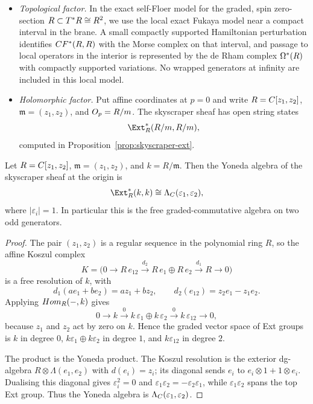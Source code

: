 \documentclass[11pt]{memoir}
\begin{document}
  \begin{itemize}
    \item \textit{Topological factor.} In the exact self-Floer model for
      the graded, spin zero-section $R\subset T^*R\cong R^2$, we use the
      local exact Fukaya model near a compact interval in the brane. A small
      compactly supported Hamiltonian perturbation identifies $CF^*(R,R)$
      with the Morse complex on that interval, and passage to local operators
      in the interior is represented by the de Rham complex $\Omega^*(R)$
      with compactly supported variations. No wrapped generators at infinity
      are included in this local model.
    \item \textit{Holomorphic factor.} Put affine coordinates at $p=0$ and write
      $R=C[z_1,z_2]$, $\mathfrak m=(z_1,z_2)$, and $O_p=R/m$.
      The skyscraper sheaf has open string states
      $$\Ext^*_R(R/\mathfrak m,R/\mathfrak m),$$
      computed in Proposition~\ref{prop:skyscraper-ext}.
  \end{itemize}

\begin{prop}\label{prop:skyscraper-ext}
  Let $R=C[z_1,z_2]$, $\mathfrak m=(z_1,z_2)$, and $k=R/\mathfrak m$. Then
  the Yoneda algebra of the skyscraper sheaf at the origin is
  $$\Ext^*_R(k,k)\cong\Lambda_{\C}(\varepsilon_1,\varepsilon_2),$$
  where $|\varepsilon_i|=1$. In particular this is the free
  graded-commutative algebra on two odd generators.
\end{prop}

\begin{proof}
  The pair $(z_1,z_2)$ is a regular sequence in the polynomial ring $R$, so the
  affine Koszul complex
  $$K=\bigl(0\to R\,e_{12}\xrightarrow{d_2}R\,e_1\oplus R\,e_2
        \xrightarrow{d_1}R\to0\bigr)$$
  is a free resolution of $k$, with
  $$d_1(ae_1+be_2)=az_1+bz_2,\qquad
    d_2(e_{12})=z_2e_1-z_1e_2.$$
  Applying $Hom_R(-,k)$ gives
  $$0\to k\xrightarrow{0}k\,\varepsilon_1\oplus k\,\varepsilon_2
    \xrightarrow{0}k\,\varepsilon_{12}\to0,$$
  because $z_1$ and $z_2$ act by zero on $k$. Hence the graded vector space of
  Ext groups is $k$ in degree $0$, $k\varepsilon_1\oplus k\varepsilon_2$ in
  degree $1$, and $k\varepsilon_{12}$ in degree $2$.

  The product is the Yoneda product. The Koszul resolution is the exterior
  dg-algebra $R\otimes\Lambda(e_1,e_2)$ with $d(e_i)=z_i$; its diagonal sends
  $e_i$ to $e_i\otimes1+1\otimes e_i$. Dualising this diagonal gives
  $\varepsilon_i^2=0$ and
  $\varepsilon_1\varepsilon_2=-\varepsilon_2\varepsilon_1$, while
  $\varepsilon_1\varepsilon_2$ spans the top Ext group. Thus the Yoneda
  algebra is $\Lambda_{C}(\varepsilon_1,\varepsilon_2)$.
\end{proof}
\end{document}

